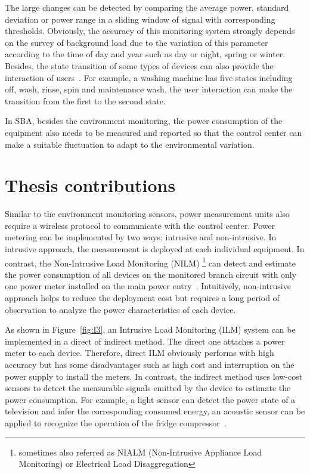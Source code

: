 The large changes can be detected by comparing the average power, standard deviation or power range in a sliding window of signal with corresponding thresholds. Obviously, the accuracy of this monitoring system strongly depends on the survey of background load due to the variation of this parameter according to the time of day and year such as day or night, spring or winter.
Besides, the state transition of some types of devices can also provide the interaction of users~\cite{Ridi15}. For example, a washing machine has five states including off, wash, rinse, spin and maintenance wash, the user interaction can make the transition from the first to the second state.

In SBA, besides the environment monitoring, the power consumption of the equipment also needs to be measured and reported so that the control center can make a suitable fluctuation to adapt to the environmental variation.


\section{Thesis contributions}
Similar to the environment monitoring sensors, power measurement units also require a wireless protocol to communicate with the control center. Power metering can be implemented by two ways: intrusive and non-intrusive. In intrusive approach, the measurement is deployed at each individual equipment. In contrast, the Non-Intrusive Load Monitoring (NILM) \footnote{sometimes also referred as NIALM (Non-Intrusive Appliance Load Monitoring) or Electrical Load Disaggregation} can detect and estimate the power consumption of all devices on the monitored branch circuit with only one power meter installed on the main power entry~\cite{Hart92}. Intuitively, non-intrusive approach helps to reduce the deployment cost but requires a long period of observation to analyze the power characteristics of each device. 

As shown in Figure~\ref{fig:I3}, an Intrusive Load Monitoring (ILM) system can be implemented in a direct of indirect method. The direct one attaches a power meter to each device. Therefore, direct ILM obviously performs with high accuracy but has some disadvantages such as high cost and interruption on the power supply to install the meters. In contrast, the indirect method uses low-cost sensors to detect the measurable signals emitted by the device to estimate the power consumption. For example, a light sensor can detect the power state of a television and infer the corresponding consumed energy, an acoustic sensor can be applied to recognize the operation of the fridge compressor~\cite{Kim09Ubicomp}. 

